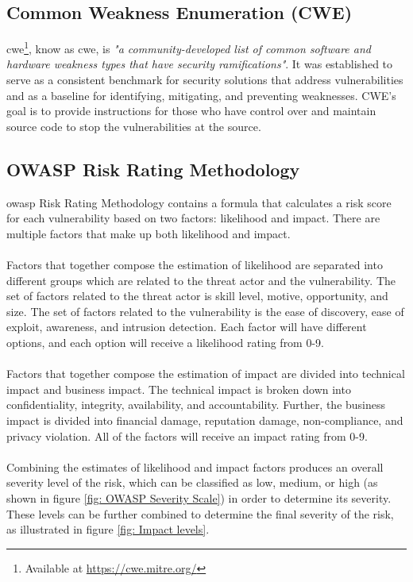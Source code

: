 \subsection{Common Weakness Enumeration (CWE)}
\label{cwe}
\acrlong{cwe}\footnote{Available at \url{https://cwe.mitre.org/}}, know as \acrshort{cwe}, is \textit{"a community-developed list of common software and hardware weakness types that have security ramifications"}\cite{CWE}. It was established to serve as a consistent benchmark for security solutions that address vulnerabilities and as a baseline for identifying, mitigating, and preventing weaknesses. CWE's goal is to provide instructions for those who have control over and maintain source code to stop the vulnerabilities at the source. 

\subsection{OWASP Risk Rating Methodology}
\acrshort{owasp} Risk Rating Methodology contains a formula that calculates a risk score for each vulnerability based on two factors: likelihood and impact. There are multiple factors that make up both likelihood and impact. 
\\~\\
Factors that together compose the estimation of likelihood are separated into different groups which are related to the threat actor and the vulnerability. The set of factors related to the threat actor is skill level, motive, opportunity, and size. The set of factors related to the vulnerability is the ease of discovery, ease of exploit, awareness, and intrusion detection. Each factor will have different options, and each option will receive a likelihood rating from 0-9. 
\\~\\
Factors that together compose the estimation of impact are divided into technical impact and business impact. The technical impact is broken down into confidentiality, integrity, availability, and accountability. Further, the business impact is divided into financial damage, reputation damage, non-compliance, and privacy violation. All of the factors will receive an impact rating from 0-9. 
\\~\\
Combining the estimates of likelihood and impact factors produces an overall severity level of the risk, which can be classified as low, medium, or high (as shown in figure \ref{fig: OWASP Severity Scale}) in order to determine its severity. These levels can be further combined to determine the final severity of the risk, as illustrated in figure \ref{fig: Impact levels}.
\cite{owasprisk}

